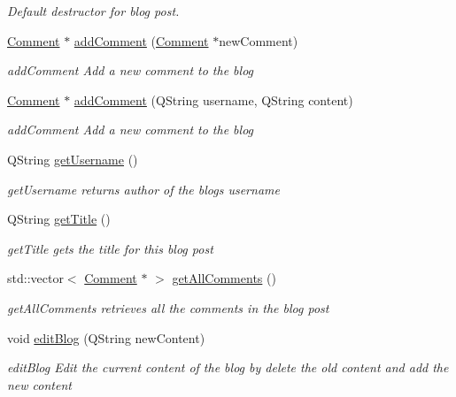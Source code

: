 \begin{DoxyCompactItemize}
\begin{DoxyCompactList}\small\item\em Default destructor for blog post. \end{DoxyCompactList}\item 
\hyperlink{classComment}{Comment} $\ast$ \hyperlink{classBlog_a102dc56c62292b0d313d552c7c530c9c}{add\+Comment} (\hyperlink{classComment}{Comment} $\ast$new\+Comment)
\begin{DoxyCompactList}\small\item\em add\+Comment Add a new comment to the blog \end{DoxyCompactList}\item 
\hyperlink{classComment}{Comment} $\ast$ \hyperlink{classBlog_a1bf61b24f505372a3174e608c85f6e11}{add\+Comment} (Q\+String username, Q\+String content)
\begin{DoxyCompactList}\small\item\em add\+Comment Add a new comment to the blog \end{DoxyCompactList}\item 
Q\+String \hyperlink{classBlog_ad101a9e5995aef40ac3a90766ceef8e4}{get\+Username} ()
\begin{DoxyCompactList}\small\item\em get\+Username returns author of the blog\textquotesingle{}s username \end{DoxyCompactList}\item 
Q\+String \hyperlink{classBlog_a6e7ded0090342698b061bbd7d3d6dab0}{get\+Title} ()
\begin{DoxyCompactList}\small\item\em get\+Title gets the title for this blog post \end{DoxyCompactList}\item 
std\+::vector$<$ \hyperlink{classComment}{Comment} $\ast$ $>$ \hyperlink{classBlog_aed8e8858743b25fbcacb7e466a6fe497}{get\+All\+Comments} ()
\begin{DoxyCompactList}\small\item\em get\+All\+Comments retrieves all the comments in the blog post \end{DoxyCompactList}\item 
void \hyperlink{classBlog_a061561d6deffb35dcaa241e4c47903ce}{edit\+Blog} (Q\+String new\+Content)
\begin{DoxyCompactList}\small\item\em edit\+Blog Edit the current content of the blog by delete the old content and add the new content \end{DoxyCompactList}\end{DoxyCompactItemize}
